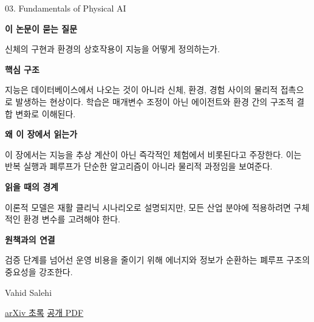 \documentclass[11pt,openany]{book}
\begin{document}
\begin{termcard}{03. Fundamentals of Physical AI}

\par

\medskip

{\sffamily\bfseries\color{deepblue} 이 논문이 묻는 질문}\par

신체의 구현과 환경의 상호작용이 지능을 어떻게 정의하는가.

\smallskip

{\sffamily\bfseries\color{deepblue} 핵심 구조}\par

지능은 데이터베이스에서 나오는 것이 아니라 신체, 환경, 경험 사이의 물리적 접촉으로 발생하는 현상이다. 학습은 매개변수 조정이 아닌 에이전트와 환경 간의 구조적 결합 변화로 이해된다.

\smallskip

{\sffamily\bfseries\color{deepblue} 왜 이 장에서 읽는가}\par

이 장에서는 지능을 추상 계산이 아닌 즉각적인 체험에서 비롯된다고 주장한다. 이는 반복 실행과 폐루프가 단순한 알고리즘이 아니라 물리적 과정임을 보여준다.

\smallskip

{\sffamily\bfseries\color{coral} 읽을 때의 경계}\par

이론적 모델은 재활 클리닉 시나리오로 설명되지만, 모든 산업 분야에 적용하려면 구체적인 환경 변수를 고려해야 한다.

\smallskip

{\sffamily\bfseries\color{teal} 원책과의 연결}\par

검증 단계를 넘어선 운영 비용을 줄이기 위해 에너지와 정보가 순환하는 폐루프 구조의 중요성을 강조한다.

\medskip

{\footnotesize\color{muted} Vahid Salehi\par

\href{https://arxiv.org/abs/2511.09497}{arXiv 초록} \quad \href{https://arxiv.org/pdf/2511.09497}{공개 PDF}\par}

\end{termcard}
\end{document}
